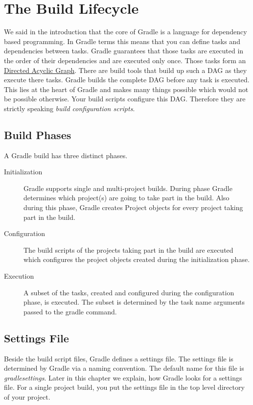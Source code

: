 \chapter{The Build Lifecycle} %
\label{cha:the_build_lifecycle}

We said in the introduction that the core of Gradle is a language for dependency based programming. In Gradle terms this means that you can define tasks and dependencies between tasks. Gradle guarantees that those tasks are executed in the order of their dependencies and are executed only once. Those tasks form an \href{http://en.wikipedia.org/wiki/Directed_acyclic_graph}{Directed Acyclic Graph}. There are build tools that build up such a DAG as they execute there tasks. Gradle builds the complete DAG before any task is executed. This lies at the heart of Gradle and makes many things possible which would not be possible otherwise. Your build scripts configure this DAG. Therefore they are strictly speaking \emph{build configuration scripts}.    

\section{Build Phases} %
\label{sec:build_phases}

A Gradle build has three distinct phases.
\begin{description}
	\item[Initialization] Gradle supports single and multi-project builds. During phase Gradle determines which project(s) are going to take part in the build. Also during this phase, Gradle creates Project objects for every project taking part in the build. 
	\item[Configuration] The build scripts of the projects taking part in the build are executed which configures the project objects created during the initialization phase.
	\item[Execution] A subset of the tasks, created and configured during the configuration phase, is executed. The subset is determined by the task name arguments passed to the gradle command.
\end{description}

\section{Settings File} %
\label{sec:settings_file}
Beside the build script files, Gradle defines a settings file. The settings file is determined by Gradle via a naming convention. The default name for this file is \emph{gradlesettings}. Later in this chapter we explain, how Gradle looks for a settings file. For a single project build, you put the settings file in the top level directory of your project.


